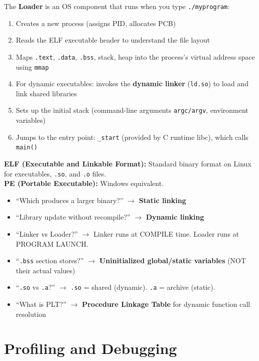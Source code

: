 \documentclass[11pt,a4paper]{article}
\newcommand{\code}[1]{\texttt{\small\colorbox{codebg}{\color{codekw}#1}}}
\newcommand{\term}[1]{\textbf{\color{darkblue}#1}}
\newcommand{\highlight}[1]{\colorbox{yellow!50}{\textbf{#1}}}
\begin{document}
The \term{Loader} is an OS component that runs when you type \code{./myprogram}:

\begin{enumerate}[noitemsep]
  \item Creates a new process (assigns PID, allocates PCB)
  \item Reads the ELF executable header to understand the file layout
  \item Maps \code{.text}, \code{.data}, \code{.bss}, stack, heap into the process's virtual address space using \code{mmap}
  \item For dynamic executables: invokes the \textbf{dynamic linker} (\code{ld.so}) to load and link shared libraries
  \item Sets up the initial stack (command-line arguments \code{argc/argv}, environment variables)
  \item Jumps to the entry point: \code{\_start} (provided by C runtime libc), which calls \code{main()}
\end{enumerate}

\textbf{ELF (Executable and Linkable Format):} Standard binary format on Linux for executables, \texttt{.so}, and \texttt{.o} files.\\
\textbf{PE (Portable Executable):} Windows equivalent.

\begin{mcqtrap}
\begin{itemize}[noitemsep]
  \item ``Which produces a larger binary?'' $\to$ \highlight{Static linking}
  \item ``Library update without recompile?'' $\to$ \highlight{Dynamic linking}
  \item ``Linker vs Loader?'' $\to$ Linker runs at COMPILE time. Loader runs at PROGRAM LAUNCH.
  \item ``\texttt{.bss} section stores?'' $\to$ \highlight{Uninitialized global/static variables} (NOT their actual values)
  \item ``\texttt{.so} vs \texttt{.a}?'' $\to$ \texttt{.so} = shared (dynamic). \texttt{.a} = archive (static).
  \item ``What is PLT?'' $\to$ \highlight{Procedure Linkage Table} for dynamic function call resolution
\end{itemize}
\end{mcqtrap}

\section{Profiling and Debugging}
\end{document}
